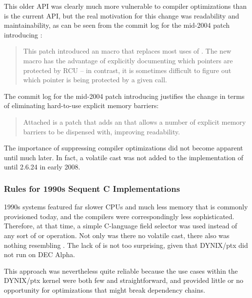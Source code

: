 \documentclass[letterpaper,twocolumn,10pt]{article}
\begin{document}
This older API was clearly much more vulnerable to compiler optimizations
than is the current API, but the real motivation for this change was
readability and maintainability, as can be seen from
the commit log for the mid-2004 patch introducing :

\begin{quote}
This patch introduced an  macro that replaces most
uses of .  The new macro has the advantage
of explicitly documenting which pointers are protected by RCU -- in
contrast, it is sometimes difficult to figure out which pointer is
being protected by a given  call.
\end{quote}

The commit log for the mid-2004 patch introducing 
justifies the change in terms of eliminating hard-to-use
explicit memory barriers:

\begin{quote}
Attached is a patch that adds an  that allows
a number of explicit  memory barriers to be dispensed with,
improving readability.
\end{quote}

The importance of suppressing compiler optimizations did not become
apparent until much later.
In fact, a volatile cast was not added to the implementation of
 until 2.6.24 in early 2008.

\subsubsection{Rules for 1990s Sequent C Implementations}
\label{sec:Rules for Sequent C Implementations}

1990s systems featured far slower CPUs and much less memory that is
commonly provisioned today, and the compilers were correspondingly
less sophisticated.
Therefore, at that time, a simple C-language field selector was used
instead of any sort of  or
 operation.
Not only was there no volatile cast, there also was nothing resembling
.
The lack of  is not too surprising, given
that DYNIX/ptx did not run on DEC Alpha.

This approach was nevertheless quite reliable because the use cases
within the DYNIX/ptx kernel were both few and straightforward, and
provided little or no opportunity for optimizations that might break
dependency chains.
\end{document}

